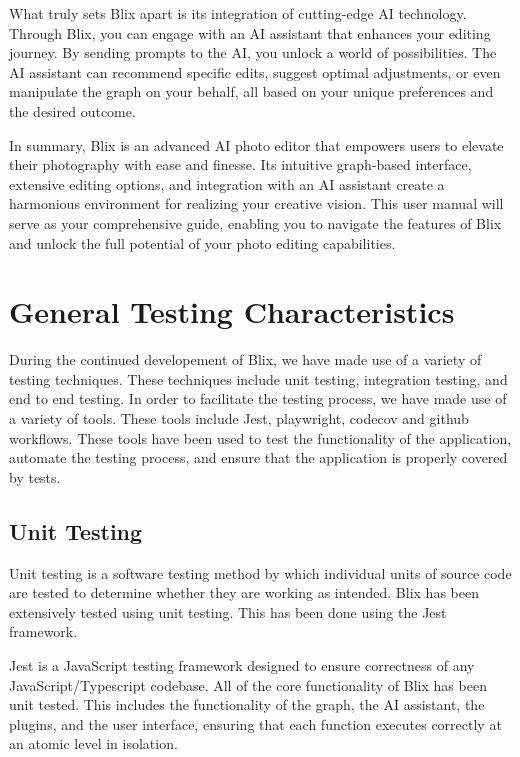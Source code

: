\documentclass[11pt,a4paper]{article}
\begin{document}
What truly sets Blix apart is its integration of cutting-edge AI technology. Through Blix, you can engage with an AI assistant that enhances your editing journey. 
By sending prompts to the AI, you unlock a world of possibilities. The AI assistant can recommend specific edits, suggest optimal adjustments, or even manipulate the graph on your behalf, 
all based on your unique preferences and the desired outcome.

In summary, Blix is an advanced AI photo editor that empowers users to elevate their photography with ease and finesse. Its intuitive graph-based interface, extensive editing options, 
and integration with an AI assistant create a harmonious environment for realizing your creative vision. This user manual will serve as your comprehensive guide, enabling you 
to navigate the features of Blix and unlock the full potential of your photo editing capabilities.
\pagebreak


\section*{General Testing Characteristics}   

During the continued developement of Blix, we have made use of a variety of testing techniques. These techniques include unit testing, integration testing, and end to end testing.
In order to facilitate the testing process, we have made use of a variety of tools. These tools include Jest, playwright, codecov and github workflows. 
These tools have been used to test the functionality of the application, automate the testing process, and ensure that the application is properly covered by tests.


\subsection*{Unit Testing}

Unit testing is a software testing method by which individual units of source code are tested to determine whether they are working as intended.
Blix has been extensively tested using unit testing. This has been done using the Jest framework. 

Jest is a JavaScript testing framework designed to ensure correctness of any JavaScript/Typescript codebase.
All of the core functionality of Blix has been unit tested. This includes the functionality of the graph, the AI assistant, the plugins, and the user interface, ensuring that each function 
executes correctly at an atomic level in isolation. 
\end{document}
